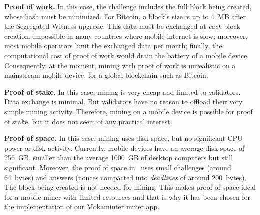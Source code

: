 \vspace{0.5ex}\noindent\textbf{Proof of work.}
%
In this case, the challenge includes the full block being
created, whose hash must be minimized.
For Bitcoin, a block's size is up to 4~MB after the Segregated Witness upgrade.
This data must be exchanged at \emph{each} block creation, impossible in many
countries where mobile internet is slow; moreover, most mobile operators limit
the exchanged data per month; finally, the computational cost
of proof of work would drain the battery of a mobile device. Consequently,
at the moment, mining with proof of work is unrealistic on a mainstream mobile device,
for a global blockchain such as Bitcoin.

\vspace{0.5ex}\noindent\textbf{Proof of stake.}
%
In this case, mining is very cheap and limited to validators. Data exchange is minimal.
But validators have no reason to offload their very simple mining activity.
Therefore, mining on a mobile device is possible for proof of stake, but it does
not seem of any practical interest.

\vspace{0.5ex}\noindent\textbf{Proof of space.}
%
In this case, mining uses disk space, but no significant
CPU power or disk activity. Currently, mobile devices have an average disk space
of 256~GB, smaller than the average 1000~GB of desktop computers but still significant.
Moreover, the proof of space in~\cite{Spoto25} uses small challenges (around 64~bytes)
and answers (nonces compacted into \emph{deadlines} of around 200~bytes).
The block being created is not needed for mining. This makes proof of space
ideal for a mobile miner with limited resources and that
is why it has been chosen for the implementation of our Mokaminter miner app.
